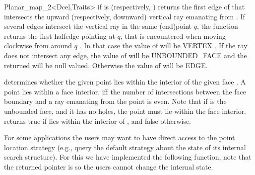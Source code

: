 \begin{ccRefClass}{Planar_map_2<Dcel,Traits>}
{if  is  (respectively,
 ) returns the first edge of  that
   intersects the upward (respectively, downward) vertical ray emanating
   from . If several edges intersect the vertical ray
   in the same (end)point $q$, the function returns the
   first halfedge pointing at $q$, that is encountered when moving clockwise 
   from  around $q$ . 
   In that case the value of  will
   be VERTEX . If the ray does not intersect any edge, the value 
   of  
   will be UNBOUNDED\_FACE and the 
   returned will be null
   valued. Otherwise the value of  will be EDGE.
    } 

{determines whether the given point  lies within the interior of
 the given face . A point lies within a face interior, iff the
 number of intersections between the face boundary and a ray emanating
 from the point is even.
 Note that if  is the unbounded face, and it has no holes,
 the point must lie within the face interior.
  returns true if  lies within the
 interior of , and false otherwise. }

\begin{ccAdvanced}
    For some applications the users may want to have direct access to
    the point location strategy (e.g., query the default strategy about
    the state of its internal search structure). For this we have implemented 
    the following function, note that the returned pointer is  so
    the users cannot change the internal state.


\end{ccAdvanced}


\end{ccRefClass}
